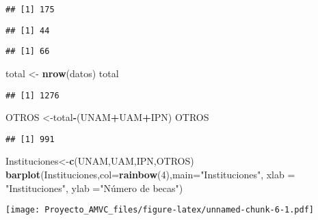 \documentclass[
]{article}
\newenvironment{Shaded}{\begin{snugshade}}{\end{snugshade}}
\newcommand{\AttributeTok}[1]{\textcolor[rgb]{0.13,0.29,0.53}{#1}}
\newcommand{\DecValTok}[1]{\textcolor[rgb]{0.00,0.00,0.81}{#1}}
\newcommand{\FunctionTok}[1]{\textcolor[rgb]{0.13,0.29,0.53}{\textbf{#1}}}
\newcommand{\NormalTok}[1]{#1}
\newcommand{\OtherTok}[1]{\textcolor[rgb]{0.56,0.35,0.01}{#1}}
\newcommand{\SpecialCharTok}[1]{\textcolor[rgb]{0.81,0.36,0.00}{\textbf{#1}}}
\newcommand{\StringTok}[1]{\textcolor[rgb]{0.31,0.60,0.02}{#1}}
\begin{document}
\begin{verbatim}
## [1] 175
\end{verbatim}

\begin{Shaded}
\end{Shaded}

\begin{verbatim}
## [1] 44
\end{verbatim}

\begin{Shaded}
\end{Shaded}

\begin{verbatim}
## [1] 66
\end{verbatim}

\begin{Shaded}
\begin{Highlighting}[]
\NormalTok{total }\OtherTok{\textless{}{-}} \FunctionTok{nrow}\NormalTok{(datos)}
\NormalTok{total}
\end{Highlighting}
\end{Shaded}

\begin{verbatim}
## [1] 1276
\end{verbatim}

\begin{Shaded}
\begin{Highlighting}[]
\NormalTok{OTROS }\OtherTok{\textless{}{-}}\NormalTok{total}\SpecialCharTok{{-}}\NormalTok{(UNAM}\SpecialCharTok{+}\NormalTok{UAM}\SpecialCharTok{+}\NormalTok{IPN)}
\NormalTok{OTROS}
\end{Highlighting}
\end{Shaded}

\begin{verbatim}
## [1] 991
\end{verbatim}

\begin{Shaded}
\begin{Highlighting}[]
\NormalTok{Instituciones}\OtherTok{\textless{}{-}}\FunctionTok{c}\NormalTok{(UNAM,UAM,IPN,OTROS)}
\FunctionTok{barplot}\NormalTok{(Instituciones,}\AttributeTok{col=}\FunctionTok{rainbow}\NormalTok{(}\DecValTok{4}\NormalTok{),}\AttributeTok{main=}\StringTok{"Instituciones"}\NormalTok{, }\AttributeTok{xlab =} \StringTok{"Instituciones"}\NormalTok{, }\AttributeTok{ylab =}\StringTok{"Número de becas"}\NormalTok{)}
\end{Highlighting}
\end{Shaded}

\texttt{[image: Proyecto\_AMVC\_files/figure-latex/unnamed-chunk-6-1.pdf]}
\end{document}
